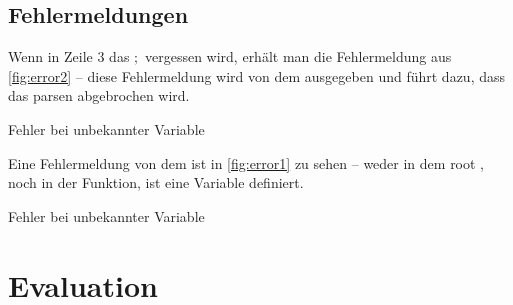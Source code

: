 {{  \subsection{Fehlermeldungen}
  \label{ssec:Fehlermeldungen}
    Wenn in Zeile 3 das \myRIn$;$ vergessen wird, erhält man die Fehlermeldung aus \autoref{fig:error2} -- diese Fehlermeldung wird von dem  ausgegeben und führt dazu, dass das parsen abgebrochen wird.

    \begin{myCodeEnv}
      \centering
      \begin{myInvBox}[width=.9\linewidth]
        
      \end{myInvBox}
      \caption{Fehler bei unbekannter Variable}
      \label{fig:error2}
    \end{myCodeEnv}

    Eine Fehlermeldung von dem  ist in \autoref{fig:error1} zu sehen -- weder in dem root , noch in der  Funktion, ist eine Variable  definiert.
    \begin{myCodeEnv}
      \centering
      \begin{myInvBox}[width=.9\linewidth]
        
      \end{myInvBox}
      \caption{Fehler bei unbekannter Variable}
      \label{fig:error1}
    \end{myCodeEnv}

\section{Evaluation}
\label{sec:Evaluation}


}}
